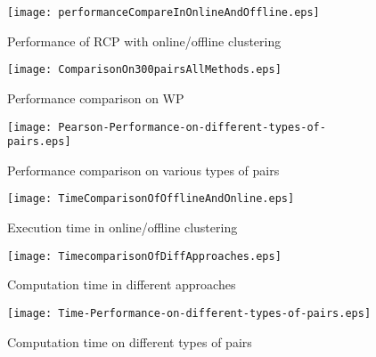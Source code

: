 \begin{figure}[th]
 \centering
 \texttt{[image: performanceCompareInOnlineAndOffline.eps]}
 \caption{Performance of RCP with online/offline clustering}
 \label{fig:online-offiline}
\end{figure}

\begin{figure}[th]
 \centering
 \texttt{[image: ComparisonOn300pairsAllMethods.eps]}
 \caption{Performance comparison on WP}
 \label{fig:ComparisonOn300pairsAllMethods}
\end{figure}

\begin{figure}[th]
 \centering
 \texttt{[image: Pearson-Performance-on-different-types-of-pairs.eps]}
 \caption{Performance comparison on various types of pairs}
 \label{fig:Pearson-Performance-on-different-types-of-pairs}
\end{figure}

\begin{figure}[th]
 \centering
 \texttt{[image: TimeComparisonOfOfflineAndOnline.eps]}
 \caption{Execution time in online/offline clustering}
 \label{fig:TimeComparisonOfOfflineAndOnline}
\end{figure}

\begin{figure}[th]
 \centering
 \texttt{[image: TimecomparisonOfDiffApproaches.eps]}
 \caption{Computation time in different approaches}
 \label{fig:TimecomparisonOfDiffApproaches}
\end{figure}

\begin{figure}[th]
 \centering
 \texttt{[image: Time-Performance-on-different-types-of-pairs.eps]}
 \caption{Computation time on different types of pairs}
 \label{fig:Time-Performance-on-different-types-of-pairs}
\end{figure}


%

